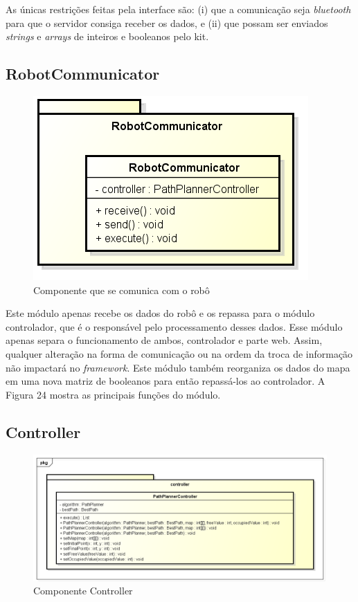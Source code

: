 As únicas restrições feitas pela interface são: (i) que a comunicação seja \textit{bluetooth} para que o servidor consiga receber os dados, e (ii) que possam ser enviados \textit{strings} e \textit{arrays} de inteiros e booleanos pelo kit.

\subsection{RobotCommunicator}

\begin{figure}[h]
	\centering
	\label{fig24}
		\includegraphics[keepaspectratio=true,scale=0.6]{figuras/tcp.png}
	\caption{Componente que se comunica com o robô}
\end{figure}

Este módulo apenas recebe os dados do robô e os repassa para o módulo controlador, que é o responsável pelo processamento desses dados. Esse módulo apenas separa o funcionamento de ambos, controlador e parte web. Assim, qualquer alteração na forma de comunicação ou na ordem da troca de informação não impactará no \textit{framework}. Este módulo também reorganiza os dados do mapa em uma nova matriz de booleanos para então repassá-los ao controlador. A Figura 24 mostra as principais funções do módulo.

\subsection{Controller}

\begin{figure}[h]
	\centering
	\label{fig25}
		\includegraphics[keepaspectratio=true,scale=0.6]{figuras/pkgcontroller.png}
	\caption{Componente Controller}
\end{figure}

